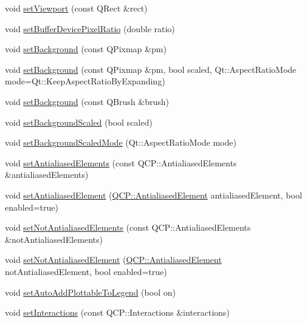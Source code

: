 \begin{DoxyCompactItemize}
\item 
void \hyperlink{class_q_custom_plot_a3f9bc4b939dd8aaba9339fd09f273fc4}{set\+Viewport} (const Q\+Rect \&rect)
\item 
void \hyperlink{class_q_custom_plot_a159162653ad6f8b8bf21263ba5787215}{set\+Buffer\+Device\+Pixel\+Ratio} (double ratio)
\item 
void \hyperlink{class_q_custom_plot_a130358592cfca353ff3cf5571b49fb00}{set\+Background} (const Q\+Pixmap \&pm)
\item 
void \hyperlink{class_q_custom_plot_a8513971d6aa24d8b0d6a68d45b542130}{set\+Background} (const Q\+Pixmap \&pm, bool scaled, Qt\+::\+Aspect\+Ratio\+Mode mode=Qt\+::\+Keep\+Aspect\+Ratio\+By\+Expanding)
\item 
void \hyperlink{class_q_custom_plot_a8ed256cf467bfa7ba1f9feaae62c3bd0}{set\+Background} (const Q\+Brush \&brush)
\item 
void \hyperlink{class_q_custom_plot_a36f0fa1317325dc7b7efea615ee2de1f}{set\+Background\+Scaled} (bool scaled)
\item 
void \hyperlink{class_q_custom_plot_a4c0eb4865b7949f62e1cb97db04a3de0}{set\+Background\+Scaled\+Mode} (Qt\+::\+Aspect\+Ratio\+Mode mode)
\item 
void \hyperlink{class_q_custom_plot_af6f91e5eab1be85f67c556e98c3745e8}{set\+Antialiased\+Elements} (const Q\+C\+P\+::\+Antialiased\+Elements \&antialiased\+Elements)
\item 
void \hyperlink{class_q_custom_plot_aeef813bcf7efab8e765f9f87ec454691}{set\+Antialiased\+Element} (\hyperlink{namespace_q_c_p_ae55dbe315d41fe80f29ba88100843a0c}{Q\+C\+P\+::\+Antialiased\+Element} antialiased\+Element, bool enabled=true)
\item 
void \hyperlink{class_q_custom_plot_ae10d685b5eabea2999fb8775ca173c24}{set\+Not\+Antialiased\+Elements} (const Q\+C\+P\+::\+Antialiased\+Elements \&not\+Antialiased\+Elements)
\item 
void \hyperlink{class_q_custom_plot_afc657938a707c890e449ae89203a076d}{set\+Not\+Antialiased\+Element} (\hyperlink{namespace_q_c_p_ae55dbe315d41fe80f29ba88100843a0c}{Q\+C\+P\+::\+Antialiased\+Element} not\+Antialiased\+Element, bool enabled=true)
\item 
void \hyperlink{class_q_custom_plot_ad8858410c2db47b7104040a3aa61c3fc}{set\+Auto\+Add\+Plottable\+To\+Legend} (bool on)
\item 
void \hyperlink{class_q_custom_plot_a5ee1e2f6ae27419deca53e75907c27e5}{set\+Interactions} (const Q\+C\+P\+::\+Interactions \&interactions)
\item 

\end{DoxyCompactItemize}
